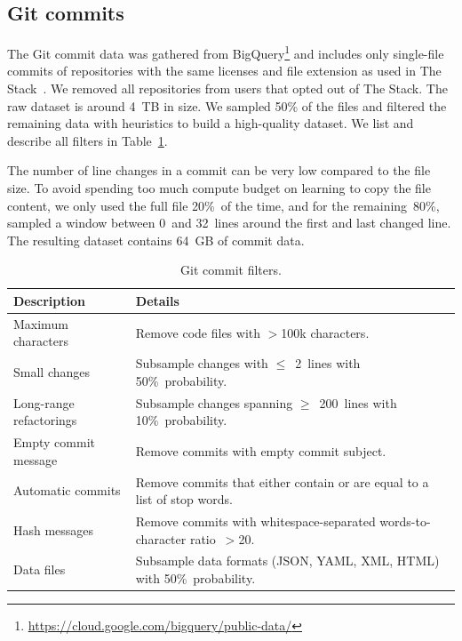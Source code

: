 \documentclass[10pt]{article} %
\begin{document}
\subsection{Git commits}
\label{sec:commits}
The Git commit data was gathered from BigQuery\footnote{\url{https://cloud.google.com/bigquery/public-data/}} and includes only single-file commits of repositories with the same licenses and file extension as used in The Stack~\citep{Kocetkov2022TheStack}. We removed all repositories from users that opted out of The Stack. The raw dataset is around 4~TB in size. We sampled 50\% of the files and filtered the remaining data with heuristics to build a high-quality dataset. We list and describe all filters in Table~\ref{tab:commit_filters}. 

The number of line changes in a commit can be very low compared to the file size. To avoid spending too much compute budget on learning to copy the file content, we only used the full file 20\%~of the time, and for the remaining~80\%, sampled a window between 0~and 32~lines around the first and last changed line. The resulting dataset contains 64~GB of commit data.

\begin{table}[t]
\centering
\begin{tabular}{p{4cm} p{9cm}}
\toprule
\textbf{Description} & \textbf{Details} \\
\midrule
Maximum characters & Remove code files with $>$100k characters. \\
Small changes & Subsample changes with $\leq$~2~lines with 50\%~probability.\\
Long-range refactorings & Subsample changes spanning $\geq$~200~lines with 10\%~probability. \\
Empty commit message & Remove commits with empty commit subject. \\
Automatic commits & Remove commits that either contain or are equal to a list of stop words. \\
Hash messages & Remove commits with whitespace-separated words-to-character ratio~$>$20. \\
Data files & Subsample data formats (JSON, YAML, XML, HTML) with 50\%~probability.\\
\bottomrule
\end{tabular}
\caption{Git commit filters.}
\label{tab:commit_filters}
\end{table}
\end{document}

